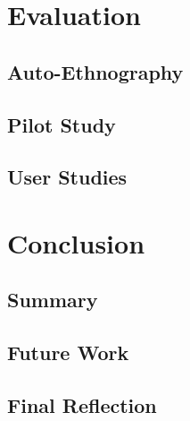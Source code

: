 \documentclass{l4proj}
\begin{document}
\chapter{Evaluation} 

\section{Auto-Ethnography}

\section{Pilot Study}

\section{User Studies}


\chapter{Conclusion}    

\section{Summary}

\section{Future Work}

\section{Final Reflection}

%
% 
\end{document}

